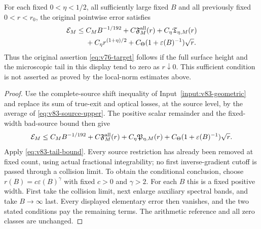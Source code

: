 \begin{theorem}
\label{thm:v83-endpoint}
For each fixed $0<\eta<1/2$, all sufficiently large fixed $B$ and
all previously fixed $0<r<r_0$, the original pointwise error satisfies
\begin{align}
 \mathcal E_M\le{}&C_MB^{-1/192}+C\mathfrak F_M^{\rm all}(r)
                         +C_\eta\mathfrak T_{\eta,M}(r)\notag\\
 &+C_\eta r^{(1+\eta)/2}
             +C_\Theta(1+\varepsilon(B)^{-1})\sqrt r.
                                                 \label{eq:v83-endpoint}
\end{align}
Thus the original assertion \eqref{eq:v76-target} follows if the
full surface height and the microscopic tail in this display tend
to zero as $r\downarrow0$. This sufficient condition is not asserted
as proved by the local-norm estimates above.
\end{theorem}
\begin{proof}
Use the complete-source shift inequality of
Input~\ref{input:v83-geometric} and replace its sum of true-exit
and optical losses, at the source level, by the average of
\eqref{eq:v83-source-upper}. The positive scalar remainder and the
fixed-width bad-source bound then give
\[
 \mathcal E_M\le C_MB^{-1/192}+C\mathfrak F_M^{\rm all}(r)
   +C_\eta\mathfrak P_{\eta,M}(r)
   +C_\Theta(1+\varepsilon(B)^{-1})\sqrt r.
\]
Apply \eqref{eq:v83-tail-bound}. Every source restriction has already
been removed at fixed count, using actual fractional integrability;
no first inverse-gradient cutoff is passed through a collision limit.
To obtain the conditional conclusion, choose
$r(B)=c\varepsilon(B)^\gamma$ with fixed $c>0$ and $\gamma>2$.
For each $B$ this is a fixed positive width. First take the collision
limit, next enlarge auxiliary spectral bands, and take $B\to\infty$
last. Every displayed elementary error then vanishes, and the two
stated conditions pay the remaining terms. The arithmetic reference
and all zero classes are unchanged.
\end{proof}

